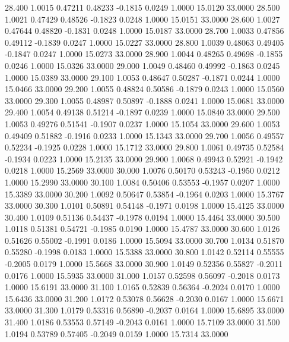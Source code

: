   28.400   1.0015   0.47211   0.48233  -0.1815   0.0249   1.0000  15.0120  33.0000
  28.500   1.0021   0.47429   0.48526  -0.1823   0.0248   1.0000  15.0151  33.0000
  28.600   1.0027   0.47644   0.48820  -0.1831   0.0248   1.0000  15.0187  33.0000
  28.700   1.0033   0.47856   0.49112  -0.1839   0.0247   1.0000  15.0227  33.0000
  28.800   1.0039   0.48063   0.49405  -0.1847   0.0247   1.0000  15.0273  33.0000
  28.900   1.0044   0.48265   0.49698  -0.1855   0.0246   1.0000  15.0326  33.0000
  29.000   1.0049   0.48460   0.49992  -0.1863   0.0245   1.0000  15.0389  33.0000
  29.100   1.0053   0.48647   0.50287  -0.1871   0.0244   1.0000  15.0466  33.0000
  29.200   1.0055   0.48824   0.50586  -0.1879   0.0243   1.0000  15.0560  33.0000
  29.300   1.0055   0.48987   0.50897  -0.1888   0.0241   1.0000  15.0681  33.0000
  29.400   1.0054   0.49138   0.51214  -0.1897   0.0239   1.0000  15.0840  33.0000
  29.500   1.0053   0.49276   0.51541  -0.1907   0.0237   1.0000  15.1054  33.0000
  29.600   1.0053   0.49409   0.51882  -0.1916   0.0233   1.0000  15.1343  33.0000
  29.700   1.0056   0.49557   0.52234  -0.1925   0.0228   1.0000  15.1712  33.0000
  29.800   1.0061   0.49735   0.52584  -0.1934   0.0223   1.0000  15.2135  33.0000
  29.900   1.0068   0.49943   0.52921  -0.1942   0.0218   1.0000  15.2569  33.0000
  30.000   1.0076   0.50170   0.53243  -0.1950   0.0212   1.0000  15.2990  33.0000
  30.100   1.0084   0.50406   0.53553  -0.1957   0.0207   1.0000  15.3389  33.0000
  30.200   1.0092   0.50647   0.53854  -0.1964   0.0203   1.0000  15.3767  33.0000
  30.300   1.0101   0.50891   0.54148  -0.1971   0.0198   1.0000  15.4125  33.0000
  30.400   1.0109   0.51136   0.54437  -0.1978   0.0194   1.0000  15.4464  33.0000
  30.500   1.0118   0.51381   0.54721  -0.1985   0.0190   1.0000  15.4787  33.0000
  30.600   1.0126   0.51626   0.55002  -0.1991   0.0186   1.0000  15.5094  33.0000
  30.700   1.0134   0.51870   0.55280  -0.1998   0.0183   1.0000  15.5388  33.0000
  30.800   1.0142   0.52114   0.55555  -0.2005   0.0179   1.0000  15.5668  33.0000
  30.900   1.0149   0.52356   0.55827  -0.2011   0.0176   1.0000  15.5935  33.0000
  31.000   1.0157   0.52598   0.56097  -0.2018   0.0173   1.0000  15.6191  33.0000
  31.100   1.0165   0.52839   0.56364  -0.2024   0.0170   1.0000  15.6436  33.0000
  31.200   1.0172   0.53078   0.56628  -0.2030   0.0167   1.0000  15.6671  33.0000
  31.300   1.0179   0.53316   0.56890  -0.2037   0.0164   1.0000  15.6895  33.0000
  31.400   1.0186   0.53553   0.57149  -0.2043   0.0161   1.0000  15.7109  33.0000
  31.500   1.0194   0.53789   0.57405  -0.2049   0.0159   1.0000  15.7314  33.0000
